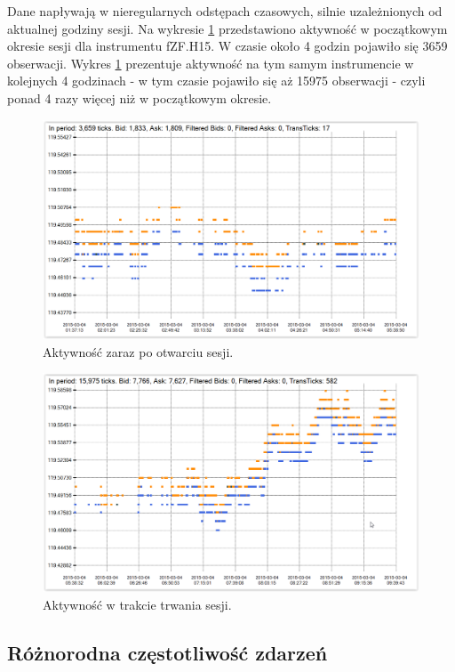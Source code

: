 \documentclass[a4paper,12pt,openany, DIV=calc, headsepline]{scrbook}
\begin{document}
Dane napływają w nieregularnych odstępach czasowych, silnie uzależnionych od aktualnej godziny sesji. Na wykresie \ref{fig:volB} przedstawiono aktywność w początkowym okresie sesji dla instrumentu fZF.H15. W czasie około 4 godzin pojawiło się 3659 obserwacji. Wykres \ref{fig:volB} prezentuje aktywność na tym samym instrumencie w kolejnych 4 godzinach - w tym czasie pojawiło się aż 15975 obserwacji - czyli ponad 4 razy więcej niż w początkowym okresie.

\begin{figure}[H]
  \centering
  \includegraphics[scale=0.5]{wykresy/vol2.PNG}
  \caption{Aktywność zaraz po otwarciu sesji.}
  \label{fig:volB}
\end{figure}

\begin{figure}[H]
  \centering
  \includegraphics[scale=0.5]{wykresy/vol1.PNG}
  \caption{Aktywność w trakcie trwania sesji.}
  \label{fig:volM}
\end{figure}

\subsection{Różnorodna częstotliwość zdarzeń}
\end{document}
